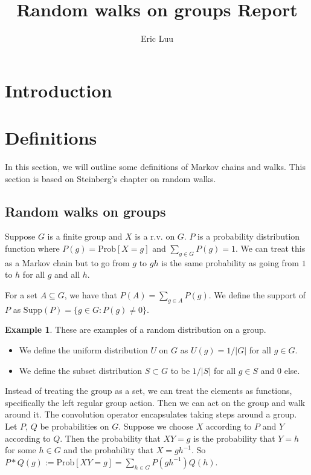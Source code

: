 \documentclass[]{article}
\title{Random walks on groups Report}
\author{Eric Luu}
\theoremstyle{definition}
\newtheorem{example}[theorem]{Example}
\numberwithin{theorem}{section}
\numberwithin{equation}{section}
\newcommand{\supp}{\text{Supp}}
\begin{document}
\maketitle
\section{Introduction}

\section{Definitions}
In this section, we will outline some definitions of Markov chains and walks. This section is based on Steinberg's chapter on random walks\cite{steinbergProbabilityRandomWalks2012}.

\subsection{Random walks on groups}
Suppose $G$ is a finite group and $X$ is a r.v. on $G$. $P$ is a probability distribution function where $P(g) = \text{Prob}[X = g]$ and $\sum_{g\in G} P(g) = 1$. We can treat this as a Markov chain but to go from $g$ to $gh$ is the same probability as going from $1$ to $h$ for all $g$ and all $h$. 

For a set $A \subseteq G$, we have that $P(A) = \sum_{g \in A} P(g)$. We define the support of $P$ as $\supp(P) = \lbrace g \in G : P(g) \neq 0 \rbrace$. 


\begin{example}
	These are examples of a random distribution on a group. 
	\begin{itemize}
		\item We define the uniform distribution $U$ on $G$ as $U(g) = 1/|G|$ for all $g \in G$. 
		\item We define the subset distribution $S \subset G$ to be $1/|S|$ for all $ g \in S$ and 0 else.
	\end{itemize}
\end{example}

Instead of treating the group as a set, we can treat the elements as functions, specifically the left regular group action. Then we can act on the group and walk around it. The convolution operator encapsulates taking steps around a group.
Let $P$, $Q$ be probabilities on $G$. Suppose we choose $X$ according to $P$ and $Y$ according to $Q$. Then the probability that $XY = g$ is the probability that $Y = h$ for some $h \in G$ and the probability that $X = gh^{-1}$. 
So $P \ast Q(g) := \text{Prob}[XY = g] = \sum_{h\in G} P(gh^{-1})Q(h) $.
\end{document}
